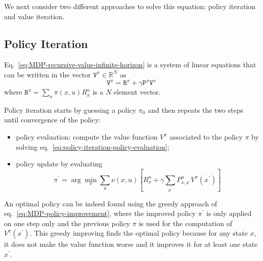 We next consider two different approaches to solve this equation: policy iteration and value iteration.

\subsection{Policy Iteration}
\label{sec:MDP-policy-iteration}

Eq.~\eqref{eq:MDP-recursive-value-infinite-horizon} is a system of linear equations that can be written in the vector $\mathtt{V}^\pi\in\mathbb{R}^N$ as
\begin{equation}
  \label{eq:policy-iteration-policy-evaluation}
  \mathtt{V}^\pi = \mathtt{R}^\pi + \gamma \mathtt{P}^\pi \mathtt{V}^\pi
\end{equation}
where $\mathtt{R}^\pi = \sum_u \pi(x,u)R_x^u$ is a $N$ element vector.

Policy iteration starts by guessing a policy $\pi_0$ and then repeats the two steps until convergence of the policy:
\begin{itemize}
\item policy evaluation: compute the value function $V^\pi$ associated to the policy $\pi$ by solving eq.~\eqref{eq:policy-iteration-policy-evaluation};
\item policy update by evaluating
  \begin{equation}
    \label{eq:MDP-policy-improvement}
    \pi^\prime = \arg \min_\nu \sum_u \nu(x,u)\left[R^u_x + \gamma \sum_{x^\prime}P^u_{x,x^\prime} V^\pi(x^\prime)\right]
  \end{equation}
\end{itemize}
An optimal policy can be indeed found using the greedy approach of eq.~\eqref{eq:MDP-policy-improvement}, where the improved policy $\pi^\prime$ is only applied on one step only and the previous policy $\pi$ is used for the computation of $V^\pi(x^\prime)$. This greedy improving finds the optimal policy because for any state $x$, it does not make the value function worse and it improves it for at least one state $x^\prime$.

